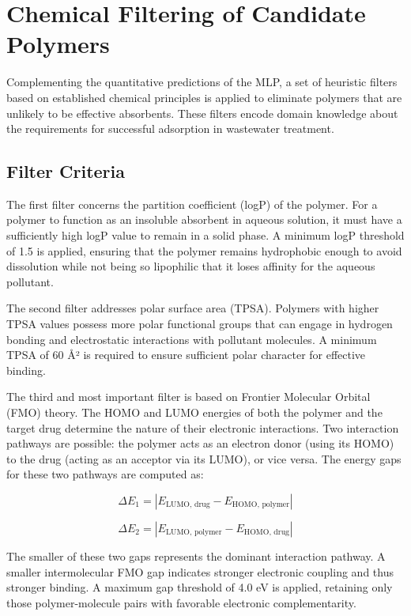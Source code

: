 \chapter{Chemical Filtering of Candidate Polymers}
\label{sec:filtering_chapter}

Complementing the quantitative predictions of the MLP, a set of heuristic filters based on established chemical principles is applied to eliminate polymers that are unlikely to be effective absorbents. These filters encode domain knowledge about the requirements for successful adsorption in wastewater treatment.

\section{Filter Criteria}

The first filter concerns the partition coefficient (logP) of the polymer. For a polymer to function as an insoluble absorbent in aqueous solution, it must have a sufficiently high logP value to remain in a solid phase. A minimum logP threshold of 1.5 is applied, ensuring that the polymer remains hydrophobic enough to avoid dissolution while not being so lipophilic that it loses affinity for the aqueous pollutant.

The second filter addresses polar surface area (TPSA). Polymers with higher TPSA values possess more polar functional groups that can engage in hydrogen bonding and electrostatic interactions with pollutant molecules. A minimum TPSA of 60 \r{A}² is required to ensure sufficient polar character for effective binding.

The third and most important filter is based on Frontier Molecular Orbital (FMO) theory. The HOMO and LUMO energies of both the polymer and the target drug determine the nature of their electronic interactions. Two interaction pathways are possible: the polymer acts as an electron donor (using its HOMO) to the drug (acting as an acceptor via its LUMO), or vice versa. The energy gaps for these two pathways are computed as:

\begin{equation}
	\Delta E_1 = |E_{\text{LUMO, drug}} - E_{\text{HOMO, polymer}}|
\end{equation}

\begin{equation}
	\Delta E_2 = |E_{\text{LUMO, polymer}} - E_{\text{HOMO, drug}}|
\end{equation}

The smaller of these two gaps represents the dominant interaction pathway. A smaller intermolecular FMO gap indicates stronger electronic coupling and thus stronger binding. A maximum gap threshold of 4.0 eV is applied, retaining only those polymer-molecule pairs with favorable electronic complementarity.

